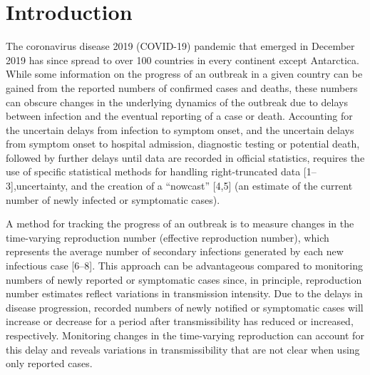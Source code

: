 \documentclass[
]{article}
\begin{document}
\hypertarget{introduction}{%
\section{Introduction}\label{introduction}}

The coronavirus disease 2019 (COVID-19) pandemic that emerged in
December 2019 has since spread to over 100 countries in every continent
except Antarctica. While some information on the progress of an outbreak
in a given country can be gained from the reported numbers of confirmed
cases and deaths, these numbers can obscure changes in the underlying
dynamics of the outbreak due to delays between infection and the
eventual reporting of a case or death. Accounting for the uncertain
delays from infection to symptom onset, and the uncertain delays from
symptom onset to hospital admission, diagnostic testing or potential
death, followed by further delays until data are recorded in official
statistics, requires the use of specific statistical methods for
handling right-truncated data {[}1--3{]},uncertainty, and the creation
of a ``nowcast'' {[}4,5{]} (an estimate of the current number of newly
infected or symptomatic cases).

A method for tracking the progress of an outbreak is to measure changes
in the time-varying reproduction number (effective reproduction number),
which represents the average number of secondary infections generated by
each new infectious case {[}6--8{]}. This approach can be advantageous
compared to monitoring numbers of newly reported or symptomatic cases
since, in principle, reproduction number estimates reflect variations in
transmission intensity. Due to the delays in disease progression,
recorded numbers of newly notified or symptomatic cases will increase or
decrease for a period after transmissibility has reduced or increased,
respectively. Monitoring changes in the time-varying reproduction can
account for this delay and reveals variations in transmissibility that
are not clear when using only reported cases.
\end{document}
